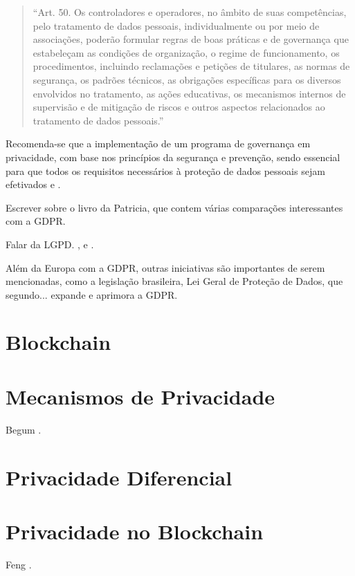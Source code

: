 \begin{quote}
``Art. 50. Os controladores e operadores, no âmbito de suas competências, pelo tratamento de dados pessoais, individualmente ou por meio de associações, poderão formular regras de boas práticas e de governança que estabeleçam as condições de organização, o regime de funcionamento, os procedimentos, incluindo reclamações e petições de titulares, as normas de segurança, os padrões técnicos, as obrigações específicas para os diversos envolvidos no tratamento, as ações educativas, os mecanismos internos de supervisão e de mitigação de riscos e outros aspectos relacionados ao tratamento de dados pessoais.''
\end{quote}

Recomenda-se que a implementação de um programa de governança em privacidade, com base nos princípios da segurança e prevenção, sendo essencial para que todos os requisitos necessários à proteção de dados pessoais sejam efetivados \citep{monteiro_efetividade_2019} e \cite{pinheiro_protecao_2020}.


Escrever sobre o livro da Patricia, que contem várias comparações interessantes com a GDPR. \cite{pinheiro_protecao_2020}

Falar da LGPD. \citep{carvalho_desafios_2019}, \citep{monteiro_efetividade_2019} e \citep{dadamos_fatores_2022}.

Além da Europa com a GDPR, outras iniciativas são importantes de serem mencionadas, como a legislação brasileira, Lei Geral de Proteção de Dados, que segundo... expande e aprimora a GDPR.

\chapter{Blockchain}

\chapter{Mecanismos de Privacidade}
Begum \cite{article:BegumSNausheenF2018}.

\chapter{Privacidade Diferencial}
\label{cap:privacidadediferencial}

\chapter{Privacidade no Blockchain}
\label{cap:blockchain}
Feng \cite{Feng2019}.

